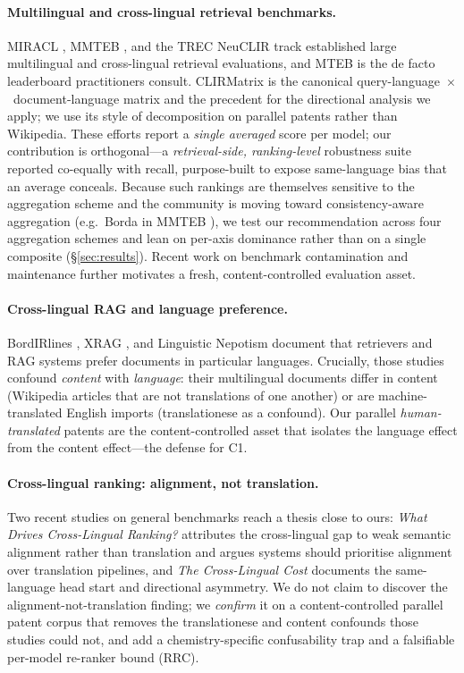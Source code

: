 \documentclass[11pt]{article}
\begin{document}
\paragraph{Multilingual and cross-lingual retrieval benchmarks.}
MIRACL \citep{miracl2023}, MMTEB \citep{mmteb2025}, and the TREC NeuCLIR track
\citep{neuclir2023} established large multilingual and cross-lingual retrieval
evaluations, and MTEB \citep{muennighoff2023mteb} is the de facto leaderboard
practitioners consult. CLIRMatrix \citep{clirmatrix2020} is the canonical
query-language~$\times$~document-language matrix and the precedent for the
directional analysis we apply; we use its style of decomposition on parallel
patents rather than Wikipedia. These efforts report a \emph{single averaged}
score per model; our contribution is orthogonal---a \emph{retrieval-side,
ranking-level} robustness suite reported co-equally with recall, purpose-built
to expose same-language bias that an average conceals. Because such rankings are
themselves sensitive to the aggregation scheme \citep{rankingrobustness2026} and
the community is moving toward consistency-aware aggregation (e.g.\ Borda in
MMTEB \citep{mmteb2025}), we test our recommendation across four aggregation
schemes and lean on per-axis dominance rather than on a single composite
(\S\ref{sec:results}). Recent work on benchmark contamination and maintenance
\citep{mteb_contamination2025} further motivates a fresh, content-controlled
evaluation asset.

\paragraph{Cross-lingual RAG and language preference.}
BordIRlines \citep{bordirlines2024}, XRAG \citep{xrag2025}, and Linguistic
Nepotism \citep{nepotism2025} document that retrievers and RAG systems prefer
documents in particular languages. Crucially, those studies confound
\emph{content} with \emph{language}: their multilingual documents differ in
content (Wikipedia articles that are not translations of one another) or are
machine-translated English imports (translationese as a confound). Our parallel
\emph{human-translated} patents are the content-controlled asset that isolates
the language effect from the content effect---the defense for C1.

\paragraph{Cross-lingual ranking: alignment, not translation.}
Two recent studies on general benchmarks reach a thesis close to ours:
\emph{What Drives Cross-Lingual Ranking?} \citep{whatdrivesclir2025} attributes
the cross-lingual gap to weak semantic alignment rather than translation and
argues systems should prioritise alignment over translation pipelines, and
\emph{The Cross-Lingual Cost} \citep{crosslingualcost2025} documents the
same-language head start and directional asymmetry. We do not claim to discover
the alignment-not-translation finding; we \emph{confirm} it on a
content-controlled parallel patent corpus that removes the translationese and
content confounds those studies could not, and add a chemistry-specific
confusability trap and a falsifiable per-model re-ranker bound (RRC).
\end{document}
